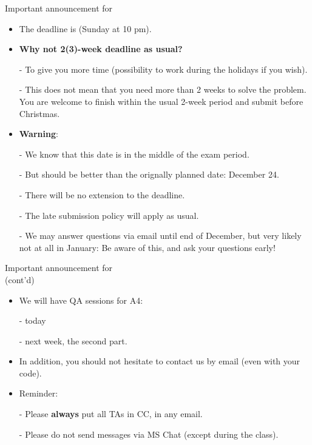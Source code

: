 \begin{frame}{Important announcement for\\ }
\small
\begin{itemize}
\item The deadline is  (Sunday at 10 pm).
\vsp
\item \textbf{Why not 2(3)-week deadline as usual?}
\item[-] To give you more time (possibility to work during the holidays if you wish).
\item[-] This does not mean that you need more than 2 weeks to solve the problem.\\
You are welcome to finish within the usual 2-week period and submit before Christmas.
\vsp
\item \textbf{\alert{Warning}}:
\item[-] We know that this date is in the middle of the exam period.
\item[-] But should be better than the orignally planned date: December 24.
\item[-] There will be no extension to the deadline.
\item[-] The late submission policy will apply as usual.
\item[-] We may answer questions via email until end of December, but very likely not at all in January: Be aware of this, and ask your questions early!
\end{itemize}
\end{frame}

\begin{frame}{Important announcement for\\  (cont'd)}
\small
\begin{itemize}
\item We will have QA sessions for A4:
\item[-] today
\item[-] next week, the second part.
\item In addition, you should not hesitate to contact us by email (even with your code).
\item Reminder: 
\item[-] Please \textbf{\alert{always}} put all TAs in CC, in any email.
\item[-] Please do not send messages via MS Chat (except during the class).
\end{itemize}
\end{frame}

